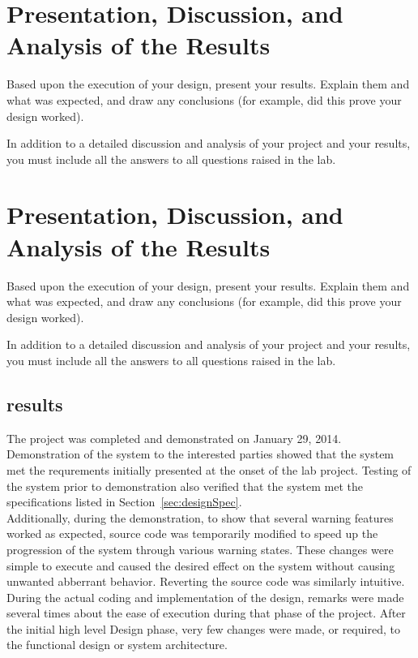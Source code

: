 \documentclass[12pt]{article} %
\begin{document}
\section{Presentation, Discussion, and Analysis of the Results}

Based upon the execution of your design, present your results. Explain them and what was expected, and draw any conclusions (for example, did this prove your design worked).

In addition to a detailed discussion and analysis of your project and your results, you must include all the answers to all questions raised in the lab.
\section{Presentation, Discussion, and Analysis of the Results}

Based upon the execution of your design, present your results. Explain them and what was expected, and draw any conclusions (for example, did this prove your design worked).

In addition to a detailed discussion and analysis of your project and your results, you must include all the answers to all questions raised in the lab.
\subsection{results}
The project was completed and demonstrated on January 29, 2014. \\

Demonstration of the system to the interested parties showed that the system met the requrements initially presented at the onset of the lab project.
Testing of the system prior to demonstration also verified that the system met the specifications listed in Section~\ref{sec:designSpec}. \\
Additionally, during the demonstration, to show that several warning features worked as expected, source code was temporarily modified to speed up the progression of the system through various warning states. These changes were simple to execute and caused the desired effect on the system without causing unwanted abberrant behavior. Reverting the source code was similarly intuitive.
During the actual coding and implementation of the design, remarks were made several times about the ease of execution during that phase of the project. After the initial high level Design phase, very few changes were made, or required, to the functional design or system architecture.\\
\end{document}
